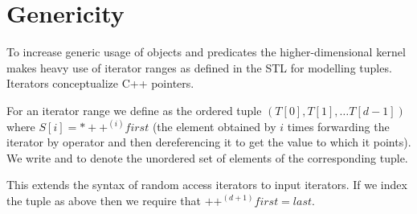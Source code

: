 \section{Genericity}

To increase generic usage of objects and predicates the
higher-dimensional kernel makes heavy use of iterator ranges as
defined in the STL for modelling tuples. Iterators conceptualize C++
pointers. 

For an iterator range \ccc{[first,last)} we define \ccc{T = tuple
  [first,last)} as the ordered tuple $(T[0],T[1], \ldots T[d-1])$
where $S[i] = *++^{(i)}\mathit{first}$ (the element obtained by $i$
times forwarding the iterator by operator \ccc{++} and then
dereferencing it to get the value to which it points).  We write \ccc{d
  = size [first,last)} and \ccc{S = set [first,last)} to denote the
unordered set of elements of the corresponding tuple.

This extends the syntax of random access iterators to input iterators.
If we index the tuple as above then we require that
$++^{(d+1)}\mathit{first} = \mathit{last}$.

